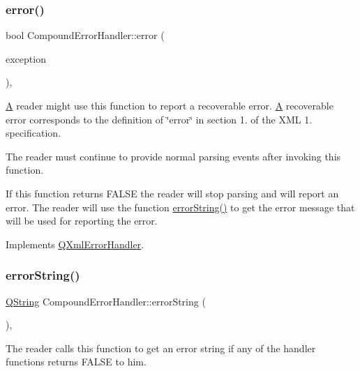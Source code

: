 \subsubsection{\texorpdfstring{error()}{error()}}
{\footnotesize\ttfamily bool Compound\+Error\+Handler\+::error (\begin{DoxyParamCaption}\item[{const \mbox{\hyperlink{class_q_xml_parse_exception}{Q\+Xml\+Parse\+Exception}} \&}]{exception }\end{DoxyParamCaption})\hspace{0.3cm}{\ttfamily [inline]}, {\ttfamily [virtual]}}

\mbox{\hyperlink{class_a}{A}} reader might use this function to report a recoverable error. \mbox{\hyperlink{class_a}{A}} recoverable error corresponds to the definition of \char`\"{}error\char`\"{} in section 1. of the X\+ML 1. specification.

The reader must continue to provide normal parsing events after invoking this function.

If this function returns F\+A\+L\+SE the reader will stop parsing and will report an error. The reader will use the function \mbox{\hyperlink{class_compound_error_handler_aceb61310e8c5649d6390a8dff0992caf}{error\+String()}} to get the error message that will be used for reporting the error. 

Implements \mbox{\hyperlink{class_q_xml_error_handler_aa7e25c4198fa16a0312fd48e5718217c}{Q\+Xml\+Error\+Handler}}.

\mbox{\label{class_compound_error_handler_aceb61310e8c5649d6390a8dff0992caf}} 
\subsubsection{\texorpdfstring{errorString()}{errorString()}}
{\footnotesize\ttfamily \mbox{\hyperlink{class_q_string}{Q\+String}} Compound\+Error\+Handler\+::error\+String (\begin{DoxyParamCaption}{ }\end{DoxyParamCaption})\hspace{0.3cm}{\ttfamily [inline]}, {\ttfamily [virtual]}}

The reader calls this function to get an error string if any of the handler functions returns F\+A\+L\+SE to him. 

